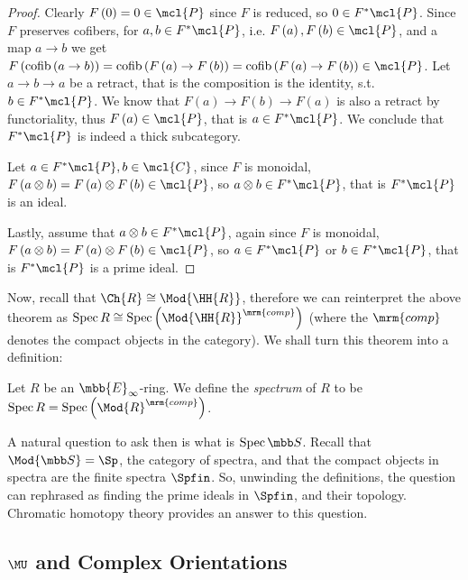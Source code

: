\begin{proof}
	Clearly $F\left(0\right) = 0 \in \mcl{P}$ since $F$ is reduced, so $0 \in F^*\mcl{P}$.
	Since $F$ preserves cofibers, for $a,b \in F^*\mcl{P}$, i.e. $F\left(a\right), F\left(b\right) \in \mcl{P}$, and a map $a \to b$ we get
	$
	F\left(\cofib\left(a \to b\right)\right)
	= \cofib\left(F\left(a\right) \to F\left(b\right)\right)
	= \cofib\left(F\left(a\right) \to F\left(b\right)\right)
	\in \mcl{P}
	$.
	Let $a \to b \to a$ be a retract, that is the composition is the identity, s.t. $b \in F^*\mcl{P}$. We know that $F\left(a\right) \to F\left(b\right) \to F\left(a\right)$ is also a retract by functoriality, thus $F\left(a\right) \in \mcl{P}$, that is $a \in F^*\mcl{P}$.
	We conclude that $F^*\mcl{P}$ is indeed a thick subcategory.
	
	Let $a \in F^*\mcl{P}, b \in \mcl{C}$, since $F$ is monoidal, $F\left(a \otimes b\right) = F\left(a\right) \otimes F\left(b\right) \in \mcl{P}$, so $a \otimes b \in F^*\mcl{P}$, that is $F^*\mcl{P}$ is an ideal.
	
	Lastly, assume that $a \otimes b \in F^*\mcl{P}$, again since $F$ is monoidal, $F\left(a \otimes b\right) = F\left(a\right) \otimes F\left(b\right) \in \mcl{P}$, so $a \in F^*\mcl{P}$ or $b \in F^*\mcl{P}$, that is $F^*\mcl{P}$ is a prime ideal.
\end{proof}

Now, recall that $\Ch{R} \cong \Mod{\HH{R}}$, therefore we can reinterpret the above theorem as $\spec R \cong \spec\left( \Mod{\HH{R}}^\mrm{comp} \right)$ (where the $\mrm{comp}$ denotes the compact objects in the category).
We shall turn this theorem into a definition:

\begin{definition}
	Let $R$ be an $\mbb{E}_\infty$-ring.
	We define the \emph{spectrum} of $R$ to be
	$\spec R = \spec\left( \Mod{R}^\mrm{comp} \right)$.
\end{definition}

A natural question to ask then is what is $\spec \SS$.
Recall that $\Mod{\SS} = \Sp$, the category of spectra, and that the compact objects in spectra are the finite spectra $\Spfin$.
So, unwinding the definitions, the question can rephrased as finding the prime ideals in $\Spfin$, and their topology.
Chromatic homotopy theory provides an answer to this question.



\subsection{\texorpdfstring{$\MU$}{MU} and Complex Orientations}

